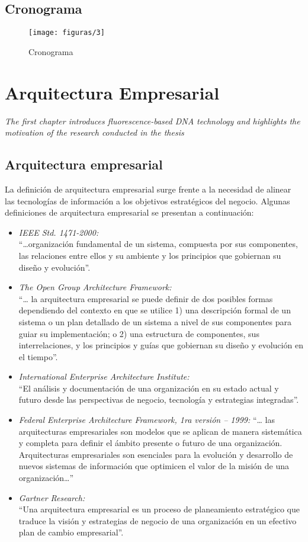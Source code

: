 \section{Cronograma}
  \begin{figure}[H]
  	\centering
  	\texttt{[image: figuras/3]}
  	\captionsetup{width=.95\textwidth}
  	\caption{Cronograma}
  	\label{figura3}
  \end{figure}

\chapter{Arquitectura Empresarial}
\label{chap:aEmpresarial}
\textit{The first chapter introduces fluorescence-based DNA technology and highlights the motivation of the research conducted in the thesis}
\vfill
\minitoc
\newpage

\section{Arquitectura empresarial}
La definición de arquitectura empresarial surge frente a la necesidad de alinear las tecnologías de información a los objetivos estratégicos del negocio. Algunas definiciones de arquitectura empresarial se presentan a continuación:
  
  \begin{itemize}
	\item \textit{IEEE Std. 1471-2000:} \\
	“…organización fundamental de un sistema, compuesta por sus componentes, las relaciones entre ellos y su ambiente y los principios que gobiernan su diseño y evolución”.
	\item \textit{The Open Group Architecture Framework:} \\
	“… la arquitectura empresarial se puede definir de dos posibles formas dependiendo del contexto en que se utilice 1) una descripción formal de un sistema o un plan detallado de un sistema a nivel de sus componentes para guiar su implementación; o 2) una estructura de componentes, sus interrelaciones, y los principios y guías que gobiernan su diseño y evolución en el tiempo”.
	\item \textit{International Enterprise Architecture Institute:} \\
	“El análisis y documentación de una organización en su estado actual y futuro desde las perspectivas de negocio, tecnología y estrategias integradas”.
	\item \textit{Federal Enterprise Architecture Framework, 1ra versión – 1999:}
	“… las arquitecturas empresariales son modelos que se aplican de manera sistemática y completa para definir el ámbito presente o futuro de una organización. Arquitecturas empresariales son esenciales para la evolución y desarrollo de nuevos sistemas de información que optimicen el valor de la misión de una organización…”
	\item \textit{Gartner Research:} \\
	“Una arquitectura empresarial es un proceso de planeamiento estratégico que traduce la visión y estrategias de negocio de una organización en un efectivo plan de cambio empresarial”.
  \end{itemize}

